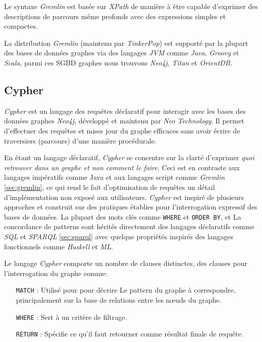   Le syntaxe \emph{Gremlin} est basée sur \emph{XPath} de manière à
  être capable d'exprimer des descriptions de parcours même profonds
  avec des expressions simples et compactes.\medskip

  La distribution \emph{Gremlin} (maintenu par \emph{TinkerPop}) est
  supporté par la plupart des bases de données graphes via des
  langages \emph{JVM} comme \emph{Java}, \emph{Groovy} et
  \emph{Scala}, parmi ces \acrshort{SGBD} graphes nous trouvons
  \emph{Neo4j}, \emph{Titan} et \emph{OrientDB}.

  \newpage
  \subsection{Cypher}
  \label{sec:cypher}
  \emph{Cypher} \cite{cypher-docs} est un langage des requêtes
  déclaratif pour interagir avec les bases des données graphes
  \emph{Neo4j}, développé et maintenu par \emph{Neo Technology}. Il
  permet d'effectuer des requêtes et mises jour du graphe efficaces
  sans avoir écrire de traversiers (parcours) d'une manière
  procédurale.\medskip

  En étant un langage déclaratif, \emph{Cypher} se concentre sur la
  clarté d'exprimer \textit{quoi retrouver dans un graphe et non
    comment le faire}. Ceci est en contraste aux langages impératifs
  comme Java et aux langages script comme \emph{Gremlin}
  \ref{sec:gremlin}, ce qui rend le fait d'optimisation de requêtes un
  détail d'implémentation non exposé aux utilisateurs. \emph{Cypher}
  est inspiré de plusieurs approches et construit sur des pratiques
  établies pour l'interrogation expressif des bases de données. La
  plupart des mots clés comme \verb|WHERE| et \verb|ORDER BY|, et La
  concordance de patterns sont hérités directement des langages
  déclaratifs comme \emph{SQL} et \emph{SPARQL} \ref{sec:sparql} avec
  quelque propriétés inspirés des langages fonctionnels comme
  \emph{Haskell} et \emph{ML}.\medskip

  Le langage \emph{Cypher} comporte un nombre de clauses distinctes,
  des clauses pour l'interrogation du graphe comme:
  \begin{itemize}
  \item [\texttt{MATCH}]: Utilisé pour pour décrire Le pattern du graphe
    à correspondre, principalement sur la base de relations entre les
    nœuds du graphe.
  \item [\texttt{WHERE}]: Sert à un critère de filtrage.
  \item [\texttt{RETURN}]: Spécifie ce qu'il faut retourner comme
    résultat finale de requête.
  \end{itemize}
  \medskip

